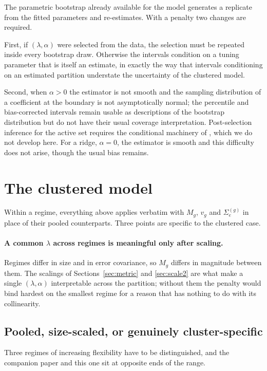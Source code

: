 \documentclass[11pt,a4paper]{article}
\newcommand{\Sig}{\Sigma}
\newcommand{\Se}{\Sig_{e}}
\begin{document}
The parametric bootstrap already available for the model generates a replicate
from the fitted parameters and re-estimates. With a penalty two changes are
required.

First, if $(\lambda,\alpha)$ were selected from the data, the selection must be
repeated inside every bootstrap draw. Otherwise the intervals condition on a
tuning parameter that is itself an estimate, in exactly the way that intervals
conditioning on an estimated partition understate the uncertainty of the
clustered model.

Second, when $\alpha > 0$ the estimator is not smooth and the sampling
distribution of a coefficient at the boundary is not asymptotically normal; the
percentile and bias-corrected intervals remain usable as descriptions of the
bootstrap distribution but do not have their usual coverage interpretation.
Post-selection inference for the active set requires the conditional machinery
of \citet{LeeSunSunTaylor2016}, which we do not develop here. For a ridge,
$\alpha = 0$, the estimator is smooth and this difficulty does not arise,
though the usual bias remains.

\section{The clustered model}
\label{sec:scstem}

Within a regime, everything above applies verbatim with $M_g$, $v_g$ and
$\Se^{(g)}$ in place of their pooled counterparts. Three points are specific to
the clustered case.

\paragraph{A common $\lambda$ across regimes is meaningful only after scaling.}
Regimes differ in size and in error covariance, so $M_g$ differs in magnitude
between them. The scalings of Sections~\ref{sec:metric} and \ref{sec:scale2}
are what make a single $(\lambda,\alpha)$ interpretable across the partition;
without them the penalty would bind hardest on the smallest regime for a reason
that has nothing to do with its collinearity.

\subsection{Pooled, size-scaled, or genuinely cluster-specific}
\label{sec:pooled}

Three regimes of increasing flexibility have to be distinguished, and the
companion paper and this one sit at opposite ends of the range.
\end{document}
